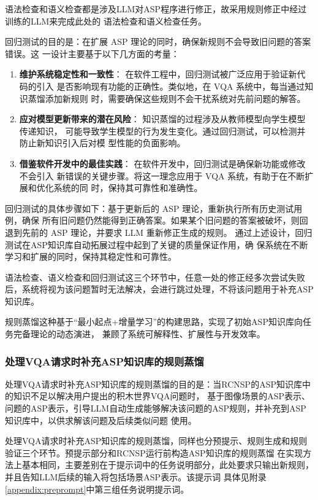语法检查和语义检查都是涉及LLM对ASP程序进行修正，故采用规则修正中经过训练的LLM来完成此处的
语法检查和语义检查任务。

回归测试的目的是：在扩展 ASP 理论的同时，确保新规则不会导致旧问题的答案错误。这
一设计主要基于以下几方面的考量：
\begin{enumerate}[nosep]
\item \textbf{维护系统稳定性和一致性}： 在软件工程中，回归测试被广泛应用于验证新代码的引入
是否影响现有功能的正确性。类似地，在 VQA 系统中，每当通过知识蒸馏添加新规则
时，需要确保这些规则不会干扰系统对先前问题的解答。
\item \textbf{应对模型更新带来的潜在风险}： 知识蒸馏的过程涉及从教师模型向学生模型传递知识，
可能导致学生模型的行为发生变化。通过回归测试，可以检测并防止新知识引入后对模
型性能的负面影响。
\item \textbf{借鉴软件开发中的最佳实践}： 在软件开发中，回归测试是确保新功能或修改不会引入
新错误的关键步骤。将这一理念应用于 VQA 系统，有助于在不断扩展和优化系统的同
时，保持其可靠性和准确性。
\end{enumerate}

回归测试的具体步骤如下：基于更新后的 ASP 理论，重新执行所有历史测试用例，确保
所有旧问题仍然能得到正确答案。如果某个旧问题的答案被破坏，则回退到先前的 ASP 理论，并要求 LLM 重新修正生成的规则。
通过上述设计，回归测试在ASP知识库自动拓展过程中起到了关键的质量保证作用，确
保系统在不断学习和扩展的同时，保持其稳定性和可靠性。

语法检查、语义检查和回归测试这三个环节中，任意一处的修正经多次尝试失败后，系统将视为该问题暂时无法解决，会进行跳过处理，不将该问题用于补充ASP知识库。

规则蒸馏这种基于“最小起点+增量学习”的构建思路，实现了初始ASP知识库向任务完备理论的动态演进，
兼顾了系统可解释性、扩展性与开发效率。
\subsubsection{处理VQA请求时补充ASP知识库的规则蒸馏}
处理VQA请求时补充ASP知识库的规则蒸馏的目的是：当RCNSP的ASP知识库中的知识不足以解决用户提出的积木世界VQA问题时，
基于图像场景的ASP表示、问题的ASP表示，引导LLM自动生成能够解决该问题的ASP规则，并补充到ASP知识库中，以供求解该问题及后续类似问题
使用。

处理VQA请求时补充ASP知识库的规则蒸馏，同样也分预提示、规则生成和规则验证三个环节。预提示部分和RCNSP运行前构造ASP知识库的规则蒸馏
在实现方法上基本相同，主要差别在于提示词中的任务说明部分，此处要求只输出新规则，并且告知LLM后续的输入将包括场景ASP表示。该提示词
具体见附录\ref{appendix:preprompt}中第三组任务说明提示词。
